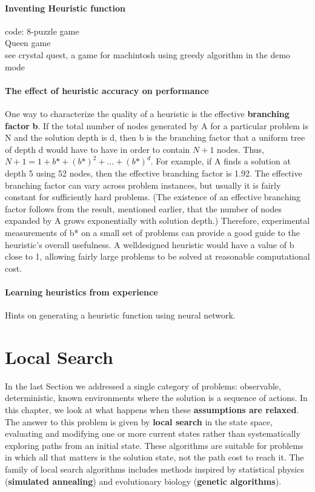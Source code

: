 \paragraph{Inventing Heuristic function}
code: 8-puzzle game\\

Queen game\\

see crystal quest, a game for machintosh using greedy algorithm in the demo mode

\paragraph{The effect of heuristic accuracy on performance}
One way to characterize the quality of a heuristic is the effective \textcolor{CadetBlue!90}{\textbf{branching factor}} \textbf{b\text{*}}. If the total number of nodes generated by A\text{*} for a particular problem is N and the solution depth is d, then b\text{*} is the branching factor that a uniform tree of depth d would have to have in order to contain $N + 1$ nodes. Thus, $N + 1 = 1+b\text{*} + (b\text{*})^{2} +\dots+ (b\text{*})^d$.
For example, if A\text{*} finds a solution at depth 5 using 52 nodes, then the effective branching factor is 1.92. The effective branching factor can vary across problem instances, but usually it is fairly constant for sufficiently hard problems. (The existence of an effective branching factor follows from the result, mentioned earlier, that the number of nodes expanded by A\text{*} grows exponentially with solution depth.) Therefore, experimental measurements of b* on a small set of problems can provide a good guide to the heuristic’s overall usefulness. A welldesigned heuristic would have a value of b\text{*} close to 1, allowing fairly large problems to be solved at reasonable computational cost.

\paragraph{Learning heuristics from experience}
Hints on generating a heuristic function using neural network.

\section{Local Search}
In the last Section we addressed a single category of problems: observable, deterministic, known environments where the solution is a sequence of actions. In this chapter, we look at what happens when these \textcolor{CadetBlue!90}{\textbf{assumptions are relaxed}}.
The answer to this problem is given by \textbf{local search} in the state space, evaluating and modifying one or more current states rather than systematically exploring paths from an initial state.
These algorithms are suitable for problems in which all that matters is the solution state, not the path cost to reach it. The family of local search algorithms includes methods inspired by statistical physics (\textbf{simulated annealing}) and evolutionary biology (\textbf{genetic algorithms}).

